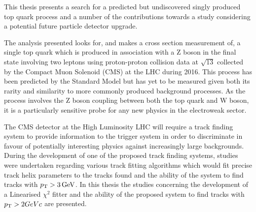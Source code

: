 This thesis presents a search for a predicted but undiscovered singly produced top quark process and a number of the contributions towards a study considering a potential future particle detector upgrade.

The analysis presented looks for, and makes a cross section measurement of, a single top quark which is produced in association with a Z boson in the final state involving two leptons using proton-proton collision data at $\sqrt{13}$ collected by the Compact Muon Solenoid (CMS) at the LHC during 2016.
This process has been predicted by the Standard Model but has yet to be measured given both its rarity and similarity to more commonly produced background processes.
As the process involves the Z boson coupling between both the top quark and W boson, it is a particularly sensitive probe for any new physics in the electroweak sector.

The CMS detector at the High Luminosity LHC will require a track finding system to provide information to the trigger system in order to discriminate in favour of potentially interesting physics against increasingly large backgrounds.
During the development of one of the proposed track finding systems, studies were undertaken regarding various track fitting algorithms which would fit precise track helix parameters to the tracks found and the ability of the system to find tracks with $p_{\mathrm{T}} > 3\,\text{Ge\hspace{-.08em}V}$.
In this thesis the studies concerning the development of a Linearised $\chi^{2}$ fitter and the ability of the proposed system to find tracks with $p_{\mathrm{T}} > 2GeVc$ are presented.


